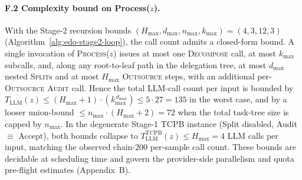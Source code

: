 \paragraph{F.2 Complexity bound on Process($z$).} With the Stage-2 recursion bounds $(H_{\max}, d_{\max}, n_{\max}, k_{\max}){=}(4,3,12,3)$ (Algorithm~\ref{alg:edo-stage2-loop}), the call count admits a closed-form bound. A single invocation of \textsc{Process}($z$) issues at most one \textsc{Decompose} call, at most $k_{\max}$ subcalls, and, along any root-to-leaf path in the delegation tree, at most $d_{\max}$ nested \textsc{Split}s and at most $H_{\max}$ \textsc{Outsource} steps, with an additional per-\textsc{Outsource} \textsc{Audit} call. Hence the total LLM-call count per input is bounded by $T_{\mathrm{LLM}}(z) \le (H_{\max}{+}1)\cdot(k_{\max}^{\,d_{\max}}) \le 5\cdot 27 = 135$ in the worst case, and by a looser union-bound $\le n_{\max}\cdot(H_{\max}{+}2) = 72$ when the total task-tree size is capped by $n_{\max}$. In the degenerate Stage-1 TCPB instance (Split disabled, Audit $\equiv$ Accept), both bounds collapse to $T_{\mathrm{LLM}}^{\mathrm{TCPB}}(z) \le H_{\max}{=}4$ LLM calls per input, matching the observed chain-200 per-sample call count. These bounds are decidable at scheduling time and govern the provider-side parallelism and quota pre-flight estimates (Appendix~B).

